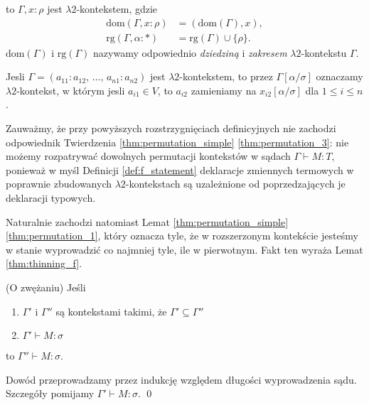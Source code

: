 \begin{definicja}
\begin{enumerate}[label=(E\arabic*), ref=(E\arabic*)]
\begin{enumerate}
    \end{enumerate}
      to \(\Gamma, x:\rho\) jest \(\lambda 2\)-kontekstem, gdzie 
      \begin{align*} 
        \mathrm{dom}(\Gamma, x:\rho)&=(\mathrm{dom}(\Gamma), x),\\
      \mathrm{rg}(\Gamma, \alpha:*)&=\mathrm{rg}(\Gamma)\cup\{\rho\}.
      \end{align*}
      \(\mathrm{dom}(\Gamma)\) i \(\mathrm{rg}(\Gamma)\) nazywamy odpowiednio \emph{dziedziną} i \emph{zakresem} \(\lambda 2\)-kontekstu \(\Gamma\).
  \end{enumerate}
    Jesli \(\Gamma=(a_{11}: a_{12},\,\dots,\,a_{n1}:a_{n2})\) jest \(\lambda 2\)-kontekstem, to przez \(\Gamma[\alpha/\sigma]\) oznaczamy \(\lambda 2\)-kontekst, w którym jesli \(a_{i1}\in V\), to \(a_{i2}\) zamieniamy na \(x_{i2}[\alpha/\sigma]\)  dla \(1\leq i \leq n\).
\end{definicja}

 \begin{uwaga*}
   Zauważmy, że przy powyższych rozstrzygnięciach definicyjnych nie zachodzi odpowiednik Twierdzenia \ref{thm:permutation_simple} \ref{thm:permutation_3}: nie możemy rozpatrywać dowolnych permutacji kontekstów w sądach \(\Gamma\vdash M:T\), ponieważ w myśl Definicji \ref{def:f_statement} deklaracje zmiennych termowych w poprawnie zbudowanych \(\lambda 2\)-kontekstach są uzależnione od poprzedzających je deklaracji typowych. 

   Naturalnie zachodzi natomiast Lemat \ref{thm:permutation_simple} \ref{thm:permutation_1}, który oznacza tyle, że w rozszerzonym kontekście jesteśmy w stanie wyprowadzić co najmniej tyle, ile w pierwotnym. Fakt ten wyraża Lemat \ref{thm:thinning_f}.
 \end{uwaga*}

\begin{lemat}(O zwężaniu)\label{thm:thinning_f}
      Jeśli \begin{enumerate}[label=(\alph*), ref=(\alph*)]
        \setlength\itemsep{0em}
        \item \(\Gamma'\) i \(\Gamma''\) są kontekstami takimi, że \(\Gamma' \subseteq \Gamma''\)
        \item \(\Gamma'\vdash M:\sigma\)
      \end{enumerate}
      to \(\Gamma''\vdash M:\sigma\).
\end{lemat}
\begin{dowod}
  Dowód przeprowadzamy przez indukcję względem długości wyprowadzenia sądu. Szczegóły pomijamy \(\Gamma'\vdash M:\sigma\).
  \qed
\end{dowod}

